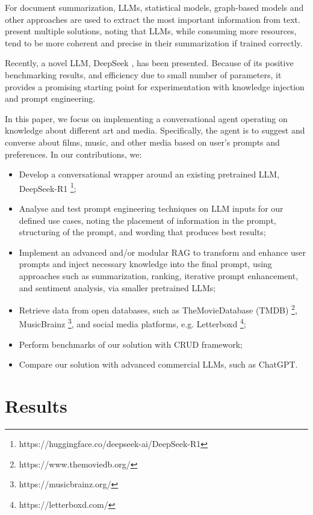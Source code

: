 \documentclass[fleqn,moreauthors,10pt]{ds_report}
\begin{document}
For document summarization, LLMs, statistical models, graph-based models and other approaches are used to extract the most important information from text. \cite{summarization} present multiple solutions, noting that LLMs, while consuming more resources, tend to be more coherent and precise in their summarization if trained correctly. 

Recently, a novel LLM, DeepSeek \cite{deepseek3}, has been presented. Because of its positive benchmarking results, and efficiency due to small number of parameters, it provides a promising starting point for experimentation with knowledge injection and prompt engineering. 



In this paper, we focus on implementing a conversational agent operating on knowledge about different art and media. Specifically, the agent is to suggest and converse about films, music, and other media based on user’s prompts and preferences. In our contributions, we: 
\begin{itemize}
\item Develop a conversational wrapper around an existing pretrained LLM, DeepSeek-R1 \footnote{https://huggingface.co/deepseek-ai/DeepSeek-R1}; 
\item Analyse and test prompt engineering techniques on LLM inputs for our defined use cases, noting the placement of information in the prompt, structuring of the prompt, and wording that produces best results; 
\item Implement an advanced and/or modular RAG to transform and enhance user prompts and inject necessary knowledge into the final prompt, using approaches such as summarization, ranking, iterative prompt enhancement, and sentiment analysis, via smaller pretrained LLMs; 
\item Retrieve data from open databases, such as The\-Movie\-Database (TMDB) \footnote{https://www.themoviedb.org/}, MusicBrainz \footnote{https://musicbrainz.org/}, and social media platforms, e.g. Letterboxd \footnote{https://letterboxd.com/}; 
\item Perform benchmarks of our solution with CRUD framework; 
\item Compare our solution with advanced commercial LLMs, such as ChatGPT. 
\end{itemize}


\section*{Results}
\end{document}
